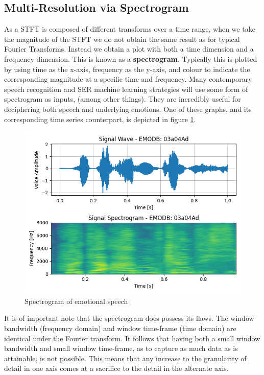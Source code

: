 \subsection{Multi-Resolution via Spectrogram}
As a STFT is composed of different transforms over a time range, when we take the magnitude of the STFT we do not obtain the same result as for typical Fourier Transforms. Instead we obtain a plot with both a time dimension and a frequency dimension. This is known as a \textbf{spectrogram}. Typically this is plotted by using time as the x-axis, frequency as the y-axis, and colour to indicate the corresponding magnitude at a specific time and frequency. Many contemporary speech recognition and SER machine learning strategies will use some form of spectrogram as inputs, (among other things). They are incredibly useful for deciphering both speech and underlying emotions. One of these graphs, and its corresponding time series counterpart, is depicted in figure \ref{t_spec_plot}.
\begin{figure}
        \centering
        \includegraphics[scale = 0.8]{images/PLOT_TimeANDSpectrogram.png}
        \caption{Spectrogram of emotional speech}
        \label{t_spec_plot}
\end{figure}
It is of important note that the spectrogram does possess its flaws. The window bandwidth (frequency domain) and window time-frame (time domain) are identical under the Fourier transform. It follows that having both a small window bandwidth and small window time-frame, as to capture as much data as is attainable, is not possible. This means that any increase to the granularity of detail in one axis comes at a sacrifice to the detail in the alternate axis. 

